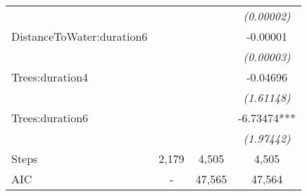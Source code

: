 \begin{tabular}[t]{lccc}
\begingroup\fontsize{8}{10}\selectfont \em{}\endgroup & \begingroup\fontsize{8}{10}\selectfont \em{}\endgroup & \begingroup\fontsize{8}{10}\selectfont \em{}\endgroup & \begingroup\fontsize{8}{10}\selectfont \em{(0.00002)}\endgroup\\
DistanceToWater:duration6 &  &  & -0.00001\\
\begingroup\fontsize{8}{10}\selectfont \em{}\endgroup & \begingroup\fontsize{8}{10}\selectfont \em{}\endgroup & \begingroup\fontsize{8}{10}\selectfont \em{}\endgroup & \begingroup\fontsize{8}{10}\selectfont \em{(0.00003)}\endgroup\\
Trees:duration4 &  &  & -0.04696\\
\begingroup\fontsize{8}{10}\selectfont \em{}\endgroup & \begingroup\fontsize{8}{10}\selectfont \em{}\endgroup & \begingroup\fontsize{8}{10}\selectfont \em{}\endgroup & \begingroup\fontsize{8}{10}\selectfont \em{(1.61148)}\endgroup\\
Trees:duration6 &  &  & -6.73474***\\
\begingroup\fontsize{8}{10}\selectfont \em{}\endgroup & \begingroup\fontsize{8}{10}\selectfont \em{}\endgroup & \begingroup\fontsize{8}{10}\selectfont \em{}\endgroup & \begingroup\fontsize{8}{10}\selectfont \em{(1.97442)}\endgroup\\
\midrule
Steps & 2,179 & 4,505 & 4,505\\
AIC & - & 47,565 & 47,564\\
\bottomrule
\end{tabular}
